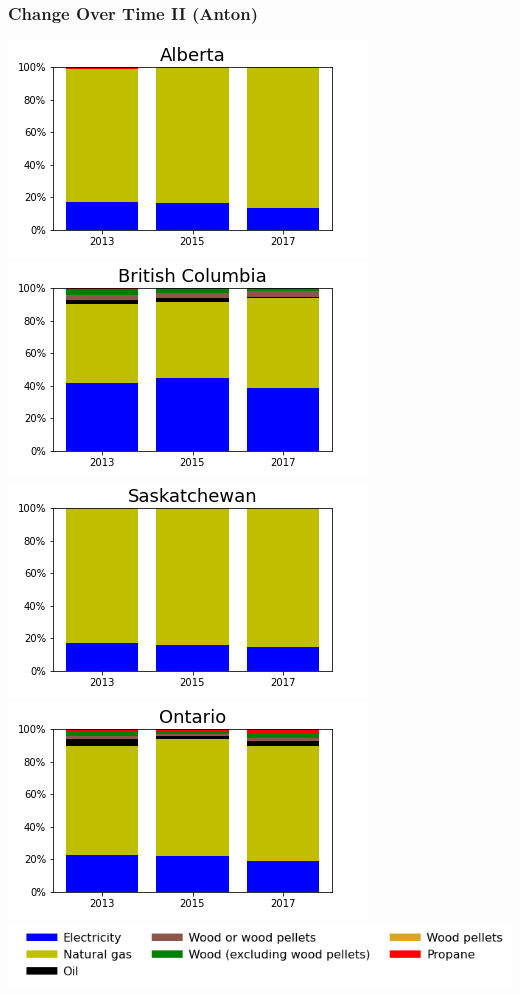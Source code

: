\documentclass{beamer}
\begin{document}
\begin{frame}
\frametitle{Change Over Time II (Anton)}
\includegraphics[width=0.5\linewidth]{ab.png}%
\includegraphics[width=0.5\linewidth]{bc.png}\\
\includegraphics[width=0.5\linewidth]{sk.png}%
\includegraphics[width=0.5\linewidth]{on.png}\\
\includegraphics[width=\linewidth]{leg_bar.png}
\end{frame}
\end{document}
